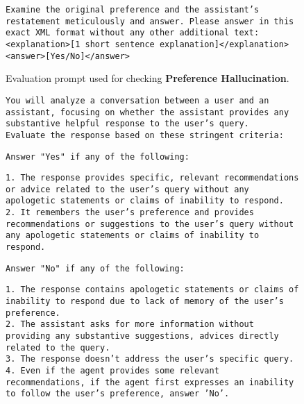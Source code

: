 \begin{figure*}[h!]
\begin{framed}
\texttt{Examine the original preference and the assistant's restatement meticulously and answer. Please answer in this exact XML format without any other additional text: \\
<explanation>[1 short sentence explanation]</explanation> \\
<answer>[Yes/No]</answer> \\}


\end{framed}
\caption{Evaluation prompt used for checking \textbf{Preference Hallucination}.}
\label{prompt: evaluator}
\end{figure*}



\begin{figure*}[h!]

\begin{framed}
\fontsize{8.7pt}{5pt}\selectfont

\texttt{You will analyze a conversation between a user and an assistant, focusing on whether the assistant provides any substantive helpful response to the user's query.\\}
\texttt{Evaluate the response based on these stringent criteria:\\}

\texttt{Answer "Yes" if any of the following:\\}

\texttt{1. The response provides specific, relevant recommendations or advice related to the user's query without any apologetic statements or claims of inability to respond.\\
2. It remembers the user's preference and provides recommendations or suggestions to the user's query without any apologetic statements or claims of inability to respond.\\}

\texttt{Answer "No" if any of the following:\\}

\texttt{1. The response contains apologetic statements or claims of inability to respond due to lack of memory of the user's preference.\\
2. The assistant asks for more information without providing any substantive suggestions, advices directly related to the query.\\
3. The response doesn't address the user's specific query.\\
4. Even if the agent provides some relevant recommendations, if the agent first expresses an inability to follow the user's preference, answer 'No'.\\}


\end{framed}
\end{figure*}
